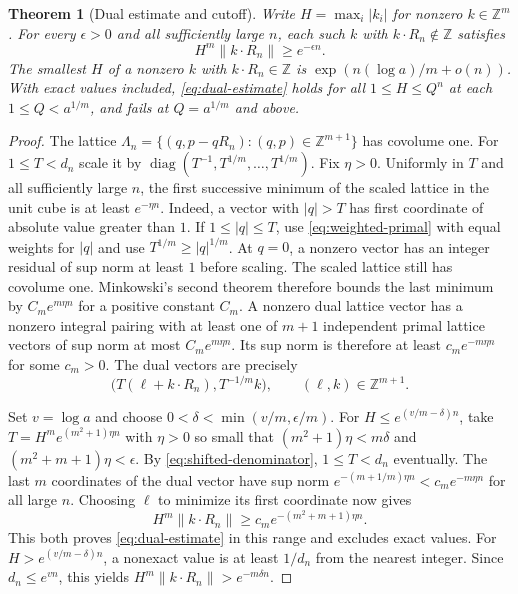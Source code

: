 \documentclass[11pt,a4paper,reqno]{amsart}
\newtheorem{theorem}{Theorem}[section]
\theoremstyle{definition}
\theoremstyle{remark}
\numberwithin{equation}{section}
\begin{document}
\begin{theorem}[Dual estimate and cutoff]\label{thm:dual}
Write \(H=\max_i|k_i|\) for nonzero \(k\in\mathbb Z^m\).
For every \(\epsilon>0\) and all sufficiently large \(n\), each
such \(k\) with \(k\cdot R_n\notin\mathbb Z\) satisfies
\begin{equation}\label{eq:dual-estimate}
 H^m\|k\cdot R_n\|\ge e^{-\epsilon n}.
\end{equation}
The smallest \(H\) of a nonzero \(k\) with \(k\cdot R_n\in\mathbb Z\)
is \(\exp(n(\log a)/m+o(n))\). With exact values included,
\eqref{eq:dual-estimate} holds for all \(1\le H\le Q^n\) at
each \(1\le Q<a^{1/m}\), and fails at \(Q=a^{1/m}\) and above.
\end{theorem}

\begin{proof}
The lattice
\(\Lambda_n=\{(q,p-qR_n): (q,p)\in\mathbb Z^{m+1}\}\)
has covolume one. For \(1\le T<d_n\) scale it by
\(\operatorname{diag}(T^{-1},T^{1/m},\ldots,T^{1/m})\).
Fix \(\eta>0\). Uniformly in \(T\) and all sufficiently large
\(n\), the first successive minimum of the scaled lattice
in the unit cube is at least \(e^{-\eta n}\).
Indeed, a vector with \(|q|>T\) has first coordinate of
absolute value greater than \(1\).
If \(1\le |q|\le T\), use \eqref{eq:weighted-primal} with
equal weights for \(|q|\) and use \(T^{1/m}\ge|q|^{1/m}\).
At \(q=0\), a nonzero vector has an integer residual of
sup norm at least \(1\) before scaling.
The scaled lattice still has covolume one. Minkowski's second
theorem therefore bounds the last minimum by
\(C_m e^{m\eta n}\) for a positive constant \(C_m\).
A nonzero dual lattice vector has a nonzero integral pairing
with at least one of \(m+1\) independent primal lattice vectors
of sup norm at most \(C_m e^{m\eta n}\). Its sup norm is
therefore at least \(c_m e^{-m\eta n}\) for some \(c_m>0\).
The dual vectors are precisely
\[
 \bigl(T(\ell+k\cdot R_n),T^{-1/m}k\bigr),
       \qquad (\ell,k)\in\mathbb Z^{m+1}.
\]

Set \(v=\log a\) and choose \(0<\delta<\min(v/m,\epsilon/m)\).
For \(H\le e^{(v/m-\delta)n}\), take
\(T=H^m e^{(m^2+1)\eta n}\) with \(\eta>0\) so small that
\((m^2+1)\eta<m\delta\) and
\((m^2+m+1)\eta<\epsilon\).
By \eqref{eq:shifted-denominator}, \(1\le T<d_n\) eventually.
The last \(m\) coordinates of the dual vector have sup norm
\(e^{-(m+1/m)\eta n}<c_m e^{-m\eta n}\) for all large \(n\).
Choosing \(\ell\) to minimize its first coordinate now gives
\[
 H^m\|k\cdot R_n\|\ge c_m e^{-(m^2+m+1)\eta n}.
\]
This both proves \eqref{eq:dual-estimate} in this range and
excludes exact values. For \(H>e^{(v/m-\delta)n}\), a nonexact
value is at least \(1/d_n\) from the nearest integer. Since
\(d_n\le e^{vn}\), this yields \(H^m\|k\cdot R_n\|>e^{-m\delta n}\).


\end{proof}
\end{document}
